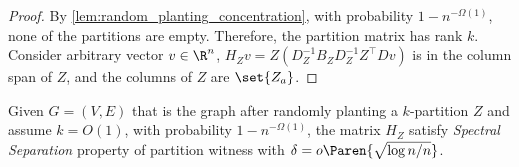 \begin{proof}
    By \cref{lem:random_planting_concentration}, with probability $1-n^{-\Omega(1)}$, none of the partitions are empty.
    Therefore, the partition matrix has rank $k$.
    Consider arbitrary vector $v \in \R^n$, $H_Z v = Z (D_Z^{-1} B_Z D_Z^{-1} Z^{\top} D v)$ is in the column span of $Z$, and the columns of $Z$ are $\set{Z_a}$.
\end{proof}

\begin{lemma}
\label{lem:random_planting_spectral_separation}
    Given $G=(V, E)$ that is the graph after randomly planting a $k$-partition $Z$ and assume $k = O(1)$, with probability $1-n^{-\Omega(1)}$, the matrix $H_Z$ satisfy \emph{Spectral Separation} property of partition witness with $\delta=o \Paren{\sqrt{\log n/n}}$.
\end{lemma}

